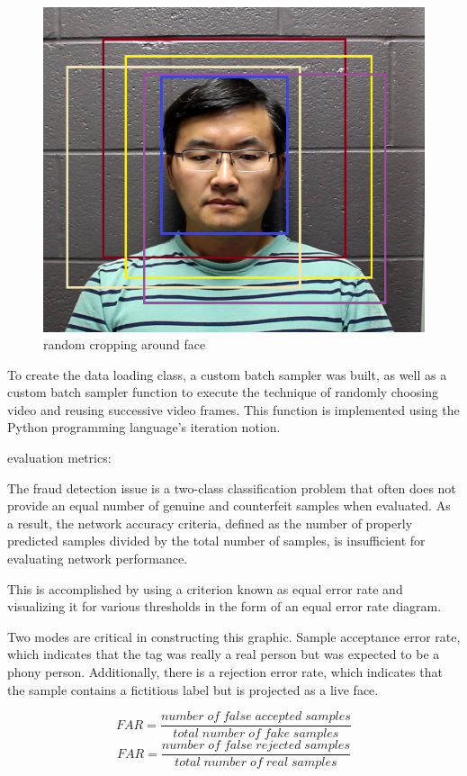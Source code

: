 \documentclass[journal]{IEEEtran}
\begin{document}
\begin{figure}[ht]
	\centerline{\includegraphics[width=\linewidth]{aug}}
	\caption{random cropping around face}
	\label{fig:aug}
\end{figure}
To create the data loading class, a custom batch sampler was built, as well as a custom batch sampler function to execute the technique of randomly choosing video and reusing successive video frames.
This function is implemented using the Python programming language's iteration notion.

evaluation metrics:

The fraud detection issue is a two-class classification problem that often does not provide an equal number of genuine and counterfeit samples when evaluated.
As a result, the network accuracy criteria, defined as the number of properly predicted samples divided by the total number of samples, is insufficient for evaluating network performance.

This is accomplished by using a criterion known as equal error rate and visualizing it for various thresholds in the form of an equal error rate diagram.

Two modes are critical in constructing this graphic.
Sample acceptance error rate, which indicates that the tag was really a real person but was expected to be a phony person.
Additionally, there is a rejection error rate, which indicates that the sample contains a fictitious label but is projected as a live face.

\begin{equation} \label{eq:far}
	FAR = \frac{number\; of\; false\; accepted\; samples}{total\; number\; of\; fake\; samples}
\end{equation}
\begin{equation} \label{eq:frr}
	FAR = \frac{number\; of\; false\; rejected\; samples}{total\; number\; of\; real\; samples}
\end{equation}
\end{document}
